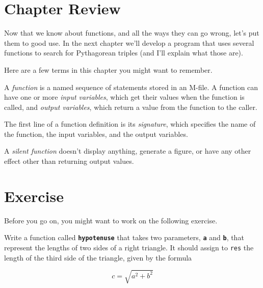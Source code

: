 \section{Chapter Review}

Now that we know about functions, and all the ways they can go wrong, let's put them to good use.  In the next chapter we'll develop a program that uses several functions to search for Pythagorean triples (and I'll explain what those are).

Here are a few terms in this chapter you might want to remember.

A \emph{function} is a named sequence of statements stored in an M-file.
A function can have one or more \emph{input variables}, which get their values when the function is called, and \emph{output variables}, which return a value from the function to the caller.

The first line of a function definition is its \emph{signature}, which
specifies the name of the function, the input variables, and the
output variables.

A \emph{silent function} doesn't display anything, generate a figure, or have any other effect other than returning output values.


\section{Exercise}

Before you go on, you might want to work on the following exercise.

\begin{ex}
\label{hypotenuse_exercise}
Write a function called \textbf{\lstinline{hypotenuse}} that takes two parameters, \textbf{\lstinline{a}} and \textbf{\lstinline{b}}, that represent the lengths of two sides of a right triangle.  It should assign to \lstinline{res} the length of the third side of the triangle, given by the formula

\[ c = \sqrt{a^2 + b^2} \]

\end{ex}
